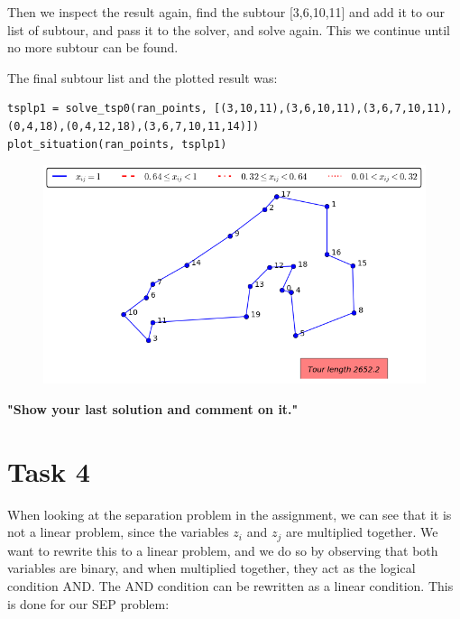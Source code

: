 \documentclass[a4paper,10pt]{article}
\begin{document}
Then we inspect the result again, find the subtour [3,6,10,11] and add it to our list of subtour, and pass it to the solver, and solve again. This we continue until no more subtour can be found.

The final subtour list and the plotted result was:

\begin{lstlisting}
tsplp1 = solve_tsp0(ran_points, [(3,10,11),(3,6,10,11),(3,6,7,10,11),(0,4,18),(0,4,12,18),(3,6,7,10,11,14)])
plot_situation(ran_points, tsplp1)
\end{lstlisting}

\begin{figure}[htb]
\begin{center}
\includegraphics[scale=0.7]{task33.png}
\end{center}
\end{figure}

\textbf{"Show your last solution and comment on it."}

\newpage
\section*{Task 4}

When looking at the separation problem in the assignment, we can see that it is not a linear problem, since the variables $z_i$ and $z_j$ are multiplied together. We want to rewrite this to a linear problem, and we do so by observing that both variables are binary, and when multiplied together, they act as the logical condition AND. The AND condition can be rewritten as a linear condition. This is done for our SEP problem:
\end{document}
